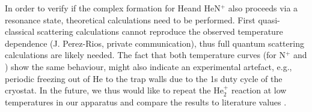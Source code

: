 In order to verify if the complex formation for He\CD and HeN$^+$ also proceeds
via a resonance state, theoretical calculations need to be performed. First
quasi-classical scattering calculations cannot reproduce the observed
temperature dependence (J. Perez-Rios, private communication), thus full quantum
scattering calculations are likely needed. The fact that both temperature
curves (for N$^+$ and \CD) show the same behaviour, might also indicate an
experimental artefact, e.g., periodic freezing out of He to the trap walls due
to the 1s duty cycle of the cryostat. In the future, we thus would like to repeat
the He$_2^+$ reaction at low temperatures in our apparatus and compare the
results to literature values \cite{bohringer_temperature_1983, plasil_stabilization_2012, gerlich_infrared_2018}.

